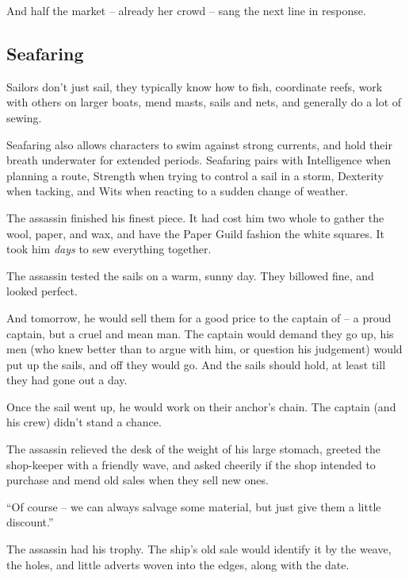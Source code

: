 \begin{multicols}{2}
\begin{exampletext}
  And half the market -- already her crowd -- sang the next line in response.

\end{exampletext}

\subsection{Seafaring}

Sailors don't just sail, they typically know how to fish, coordinate reefs, work with others on larger boats, mend masts, sails and nets, and generally do a lot of sewing.

Seafaring also allows characters to swim against strong currents, and hold their breath underwater for extended periods.
Seafaring pairs with Intelligence when planning a route, Strength when trying to control a sail in a storm, Dexterity when tacking, and Wits when reacting to a sudden change of weather.

\begin{exampletext}
  The assassin finished his finest piece.
  It had cost him two whole  to gather the wool, paper, and wax, and have the Paper Guild fashion the white squares.
  It took him \emph{days} to sew everything together.

  The assassin tested the sails on a warm, sunny day.
  They billowed fine, and looked perfect.

  And tomorrow, he would sell them for a good price to the captain of \iftoggle{aif}{\gls{king}'s Pride}{the Black Seal} -- a proud captain, but a cruel and mean man.
  The captain would demand they go up, his men (who knew better than to argue with him, or question his judgement) would put up the sails, and off they would go.
  And the sails should hold, at least till they had gone out a day.

  Once the sail went up, he would work on their anchor's chain.
  The captain (and his crew) didn't stand a chance.

  The assassin relieved the desk of the weight of his large stomach, greeted the shop-keeper with a friendly wave, and asked cheerily if the shop intended to purchase and mend old sales when they sell new ones.

  ``Of course -- we can always salvage some material, but just give them a little discount.''

  The assassin had his trophy.
  The ship's old sale would identify it by the weave, the holes, and little adverts woven into the edges, along with the date.


\end{exampletext}
\end{multicols}
